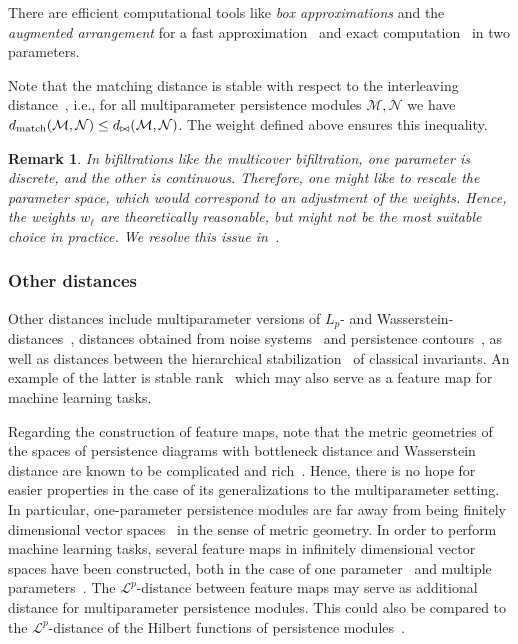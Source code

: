 \documentclass[sigconf, nonacm, natbib=false]{acmart} %
\def\M {{\mathcal{M}}}
\def\N {{\mathcal{N}}}
\def\interdist{d_{\bowtie}}
\def\matchdist{d_{\textnormal{match}}}
\theoremstyle{plain}
\newtheorem{remark}{Remark}
\begin{document}
There are efficient computational tools like \emph{box approximations} and the \emph{augmented arrangement} for a fast approximation~\cite{kerber2020efficient} and exact computation~\cite{kerber2019exact} in two parameters. %

Note that the matching distance is stable with respect to the interleaving distance~\cite{landi2014rank}, i.e., for all multiparameter persistence modules $\M,\N$ we have $\matchdist(\M,\N)\leq\interdist(\M,\N)$. The weight defined above ensures this inequality.

\begin{remark}
In bifiltrations like the multicover bifiltration, one parameter is discrete, and the other is continuous. 
Therefore, one might like to rescale the parameter space, which would correspond to an adjustment of the weights.
Hence, the weights $w_\ell$ are theoretically reasonable, 
but might not be the most suitable choice in practice. We resolve this issue in~.\label{remark:weigth_path_short_coming}
\end{remark} 

\subsubsection{Other distances}
Other distances include multiparameter versions of ${L}_p$- and Wasserstein-distances~\cite{bjerkevik2021lp,thomasdiss,bubenik2018algebraic}, distances obtained from noise systems~\cite{scolamiero2017multidimensional} and persistence contours~\cite{gafvert2017stable}, as well as distances between the hierarchical stabilization~\cite{gafvert2017stable} of classical invariants. An example of the latter is stable rank~\cite{gafvert2017stable,CCS21} which may also serve as a feature map for machine learning tasks.

Regarding the construction of feature maps, note that the metric geometries of the spaces of persistence diagrams with bottleneck distance and Wasserstein distance are known to be complicated and rich~\cite{bubenik2020embeddings,mileyko2011probability,turner2014frechet}. 
Hence, there is no hope for easier properties in the case of its generalizations to the multiparameter setting. 
In particular, one-parameter persistence modules are far away from being finitely dimensional vector spaces~\cite{bubenik2020embeddings,carriere2018metric,wagner2021nonembeddability} in the sense of metric geometry.
In order to perform machine learning tasks, several feature maps in infinitely dimensional vector spaces have been constructed, both in the case of one parameter~\cite{Reininghaus2015,KusanoFukumizuHiraoka2016,riihimaki2018generalized} and multiple parameters~\cite{corbet2019kernel,vipond2018multiparameter,carriere2020multiparameter,CCS21}.
The $\mathcal{L}^p$-distance between feature maps may serve as additional distance for multiparameter persistence modules. This could also be compared to the $\mathcal{L}^p$-distance of the Hilbert functions of persistence modules~\cite{Keller2018}.
\end{document}
